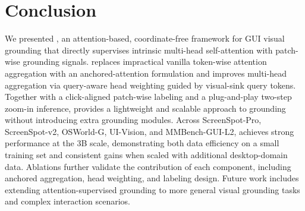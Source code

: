 \section{Conclusion}
We presented \method{}, an attention-based, coordinate-free framework for GUI visual grounding that directly supervises intrinsic multi-head self-attention with patch-wise grounding signals. \method{} replaces impractical vanilla token-wise attention aggregation with an anchored-attention formulation and improves multi-head aggregation via query-aware head weighting guided by visual-sink query tokens. Together with a click-aligned patch-wise labeling and a plug-and-play two-step zoom-in inference, \method{} provides a lightweight and scalable approach to grounding without introducing extra grounding modules. Across ScreenSpot-Pro, ScreenSpot-v2, OSWorld-G, UI-Vision, and MMBench-GUI-L2, \method{} achieves strong performance at the 3B scale, demonstrating both data efficiency on a small training set and consistent gains when scaled with additional desktop-domain data. Ablations further validate the contribution of each component, including anchored aggregation, head weighting, and labeling design. Future work includes extending attention-supervised grounding to more general visual grounding tasks and complex interaction scenarios.
\newpage